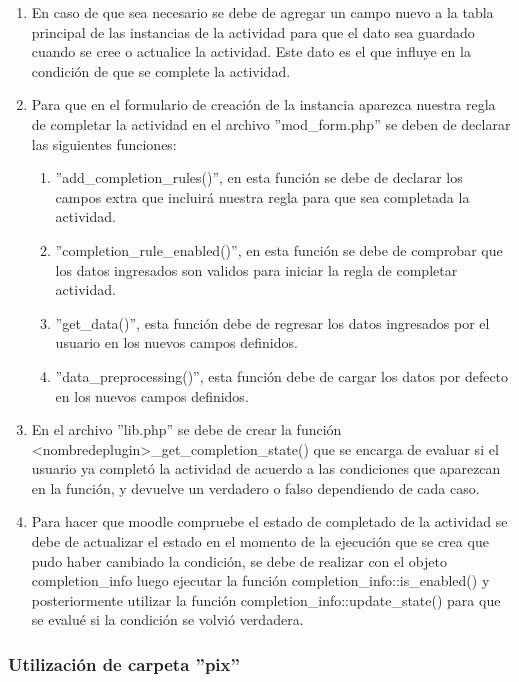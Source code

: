       \begin{enumerate}
        \item En caso de que sea necesario se debe de agregar un campo nuevo a la tabla principal de las instancias de la actividad para que el dato sea guardado cuando se cree o actualice la actividad. Este dato es el que influye en la condición de que se complete la actividad.
        \item Para que en el formulario de creación de la instancia aparezca nuestra regla de completar la actividad en el archivo ''mod\_form.php'' se deben de declarar las siguientes funciones:

        \begin{enumerate}
          \item ''add\_completion\_rules()'', en esta función se debe de declarar los campos extra que incluirá nuestra regla para que sea completada la actividad.
          \item ''completion\_rule\_enabled()'', en esta función se debe de comprobar que los datos ingresados son validos para iniciar la regla de completar actividad.
          \item ''get\_data()'', esta función debe de regresar los datos ingresados por el usuario en los nuevos campos definidos.
          \item ''data\_preprocessing()'', esta función debe de cargar los datos por defecto en los nuevos campos definidos.
        \end{enumerate}

        \item En el archivo ''lib.php'' se debe de crear la función <nombredeplugin>\_get\_completion\_state() que se encarga de evaluar si el usuario ya completó la actividad de acuerdo a las condiciones que aparezcan en la función, y devuelve un verdadero o falso dependiendo de cada caso.
        \item Para hacer que moodle compruebe el estado de completado de la actividad se debe de actualizar el estado en el momento de la ejecución que se crea que pudo haber cambiado la condición, se debe de realizar con el objeto completion\_info luego ejecutar la función completion\_info::is\_enabled() y posteriormente utilizar la función completion\_info::update\_state() para que se evalué si la condición se volvió verdadera.

      \end{enumerate}


  \subsubsection{Utilización de carpeta ''pix''}

